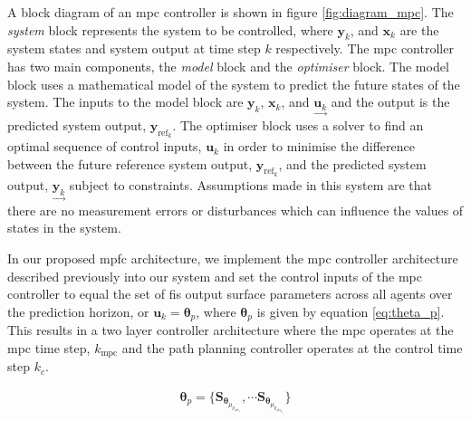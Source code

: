 \documentclass[conference]{IEEEtran}
\begin{document}
A block diagram of an \gls{mpc} controller is shown in figure \ref{fig:diagram_mpc}.
The \textit{system} block represents the system to be controlled, where $\bm{y}_{k}$, and $\bm{x}_{k}$ are the system states and system output at time step $k$ respectively.
The \gls{mpc} controller has two main components, the \textit{model} block and the \textit{optimiser} block.
The model block uses a mathematical model of the system to predict the future states of the system.
The inputs to the model block are $\bm{y}_{k}$, $\bm{x}_{k}$, and $\underset{\rightarrow}{\bm{u}_{k}}$ and the output is the predicted system output, $\bm{y}_{\text{ref}_{k}}$.
The optimiser block uses a solver to find an optimal sequence of control inputs, $\bm{u}_{k}$ in order to minimise the difference between the future reference system output, $\bm{y}_{\text{ref}_{k}}$, and the predicted system output, $\underset{\rightarrow}{\bm{y}_{k}}$ subject to constraints.
Assumptions made in this system are that there are no measurement errors or disturbances which can influence the values of states in the system.

In our proposed \gls{mpfc} architecture, we implement the \gls{mpc} controller architecture described previously into our system and set the control inputs of the \gls{mpc} controller to equal the set of \gls{fis} output surface parameters across all agents over the prediction horizon, or $\bm{u}_{k} = \bm{\theta}_{p}$, where $\bm{\theta}_{p}$ is given by equation \ref{eq:theta_p}.
This results in a two layer controller architecture where the \gls{mpc} operates at the \gls{mpc} time step, $k_{\text{mpc}}$ and the path planning controller operates at the control time step $k_{c}$.


\begin{equation*} \label{eq:theta_p}
    \begin{split}
        \bm{\theta}_{p} = \{ \bm{S}_{\bm{\theta}_{\mu_{p_{\text{att}_{1}}}}}, \cdots \bm{S}_{\bm{\theta}_{\mu_{p_{\text{att}_{n_{p}}}}}} \}
        \end{split}
\end{equation*}
\end{document}
